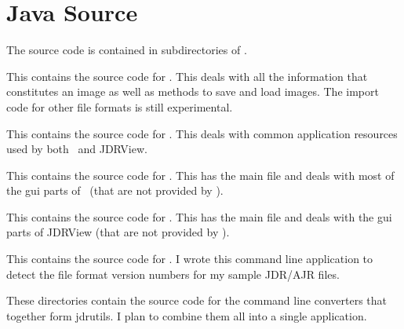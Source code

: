 \section{Java Source}\label{sec:javasource}

The source code is contained in subdirectories of
.

\begin{deflist}
\begin{itemdesc}
This contains the source code for . This deals with
all the information that constitutes an image as well as methods to
save and load images. The import code for other file formats is
still experimental.
\end{itemdesc}

\begin{itemdesc}
This contains the source code for . This
deals with common application resources used by both \FlowframTk\
and JDRView.
\end{itemdesc}

\begin{itemdesc}
This contains the source code for . This
has the main file and deals with most of the \gls{gui} parts of 
\FlowframTk\ (that are not provided by \filefmt{jdrresources}).
\end{itemdesc}

\begin{itemdesc}
This contains the source code for . This has
the main file and deals with the \gls{gui} parts of JDRView
(that are not provided by ).
\end{itemdesc}

\begin{itemdesc}
This contains the source code for . I wrote this
command line application to detect the file format version numbers for my sample 
\gls{JDR}/\gls{AJR} files.
\end{itemdesc}

\begin{itemdesc}
These directories contain the source code for the command line
converters that together form jdrutils. I plan to combine them all
into a single application.
\end{itemdesc}

\end{deflist}

